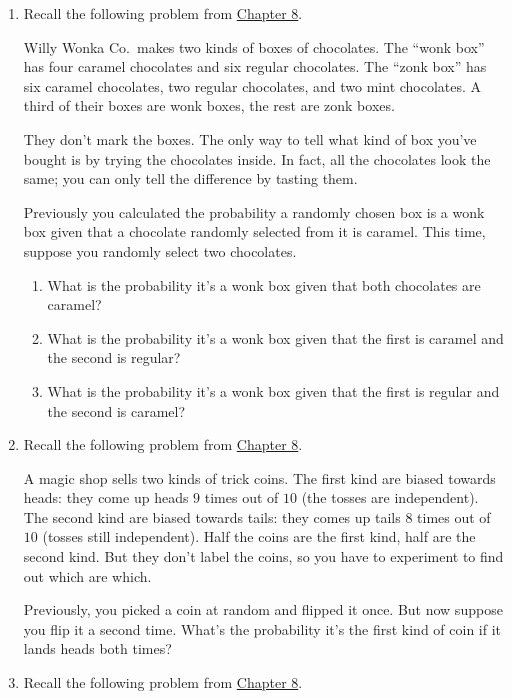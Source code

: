 \documentclass[justified]{tufte-book}
\providecommand{\tightlist}{%
  \setlength{\itemsep}{0pt}\setlength{\parskip}{0pt}}
\theoremstyle{definition}
\theoremstyle{definition}
\theoremstyle{definition}
\theoremstyle{remark}
\begin{document}
\begin{enumerate}
\item
  Recall the following problem from
  \protect\hyperlink{bayes-theorem}{Chapter 8}.

  Willy Wonka Co.~makes two kinds of boxes of chocolates. The ``wonk
  box'' has four caramel chocolates and six regular chocolates. The
  ``zonk box'' has six caramel chocolates, two regular chocolates, and
  two mint chocolates. A third of their boxes are wonk boxes, the rest
  are zonk boxes.

  They don't mark the boxes. The only way to tell what kind of box
  you've bought is by trying the chocolates inside. In fact, all the
  chocolates look the same; you can only tell the difference by tasting
  them.

  Previously you calculated the probability a randomly chosen box is a
  wonk box given that a chocolate randomly selected from it is caramel.
  This time, suppose you randomly select two chocolates.

  \begin{enumerate}
  \def\labelenumii{\alph{enumii}.}
  \tightlist
  \item
    What is the probability it's a wonk box given that both chocolates
    are caramel?
  \item
    What is the probability it's a wonk box given that the first is
    caramel and the second is regular?
  \item
    What is the probability it's a wonk box given that the first is
    regular and the second is caramel?
  \end{enumerate}
\item
  Recall the following problem from
  \protect\hyperlink{bayes-theorem}{Chapter 8}.

  A magic shop sells two kinds of trick coins. The first kind are biased
  towards heads: they come up heads \(9\) times out of \(10\) (the
  tosses are independent). The second kind are biased towards tails:
  they comes up tails \(8\) times out of \(10\) (tosses still
  independent). Half the coins are the first kind, half are the second
  kind. But they don't label the coins, so you have to experiment to
  find out which are which.

  Previously, you picked a coin at random and flipped it once. But now
  suppose you flip it a second time. What's the probability it's the
  first kind of coin if it lands heads both times?
\item
  Recall the following problem from
  \protect\hyperlink{bayes-theorem}{Chapter 8}.


\end{enumerate}
\end{document}
